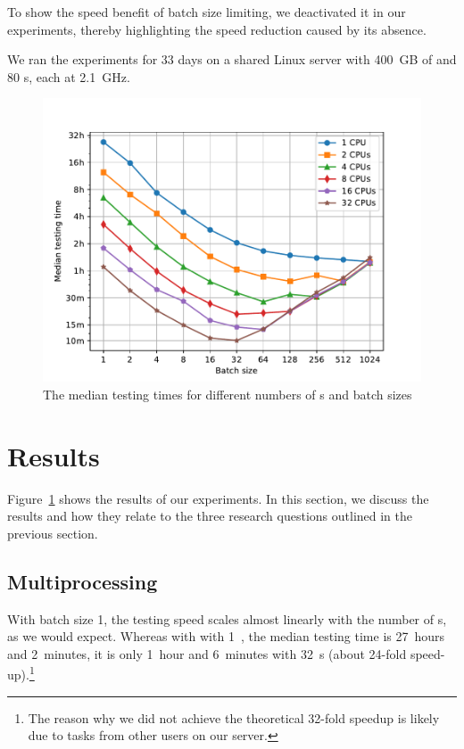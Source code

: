 \documentclass[final]{ltugboat}
\begin{document}
To show the speed benefit of batch size limiting, we deactivated it in our experiments, thereby highlighting the speed reduction caused by its absence.

We ran the experiments for 33 days on a shared Linux server with 400~GB of  and 80 s, each at 2.1~GHz.

\begin{figure}
\includegraphics[trim={0.5cm 0.3cm 1.6cm 1.4cm}, clip, width=\linewidth]{images/speed-tests}
\caption{The median testing times for different numbers of s and batch sizes}
\label{fig:results}
\end{figure}

\section{Results}
\label{sec:results}

Figure~\ref{fig:results} shows the results of our experiments. In this section, we discuss the results and how they relate to the three research questions outlined in the previous section.

\subsection{Multiprocessing}
With batch size 1, the testing speed scales almost linearly with the number of s, as we would expect. Whereas with with 1~, the median testing time is 27~hours and 2~minutes, it is only 1~hour and 6~minutes with 32~s (about 24-fold speed-up).\footnote{%
The reason why we did not achieve the theoretical 32-fold speedup is likely due to tasks from other users on our server.%
}
\end{document}
